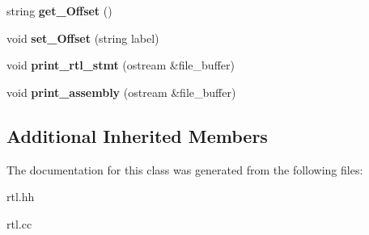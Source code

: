 \begin{DoxyCompactItemize}
\item 
\mbox{\label{classControl__Flow__RTL__Stmt_a3ea5ab369e49b356ef01136c8591c1ef}} 
string {\bfseries get\+\_\+\+Offset} ()
\item 
\mbox{\label{classControl__Flow__RTL__Stmt_adeb4805b9ed2b66688e5ac62b645c278}} 
void {\bfseries set\+\_\+\+Offset} (string label)
\item 
\mbox{\label{classControl__Flow__RTL__Stmt_a779b5906f7107b474bf1ccdee671a5e1}} 
void {\bfseries print\+\_\+rtl\+\_\+stmt} (ostream \&file\+\_\+buffer)
\item 
\mbox{\label{classControl__Flow__RTL__Stmt_a08cc553b4740c0aeaa82d247b969803a}} 
void {\bfseries print\+\_\+assembly} (ostream \&file\+\_\+buffer)
\end{DoxyCompactItemize}
\subsection*{Additional Inherited Members}


The documentation for this class was generated from the following files\+:\begin{DoxyCompactItemize}
\item 
rtl.\+hh\item 
rtl.\+cc\end{DoxyCompactItemize}
